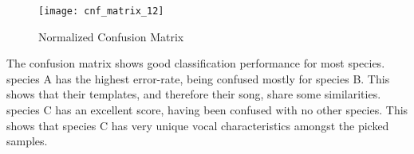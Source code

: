 \begin{figure}[!htb]
  \centering
  \texttt{[image: cnf\_matrix\_12]}
  \caption{Normalized Confusion Matrix}\label{fig:cnf12}
\end{figure}

The confusion matrix shows good classification performance for most species.\\

species A has the highest error-rate, being confused mostly for species B.
This shows that their templates, and therefore their song, share some
similarities.\\

species C has an excellent score, having been confused with no other species.
This shows that species C has very unique vocal characteristics amongst the
picked samples.
